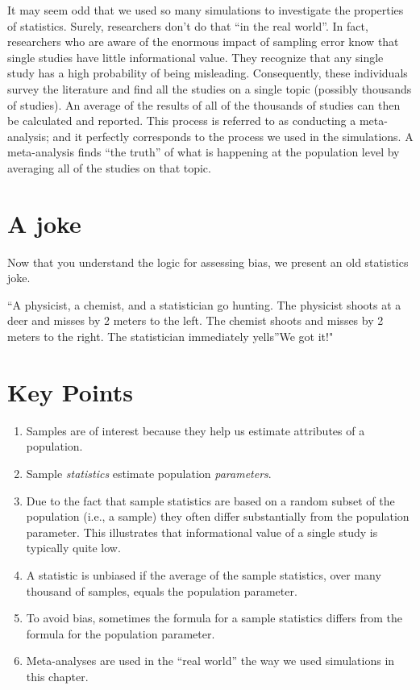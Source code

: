 \documentclass[
]{krantz}
\renewenvironment{quote}{\begin{VF}}{\end{VF}}
\begin{document}
It may seem odd that we used so many simulations to investigate the properties of statistics. Surely, researchers don't do that ``in the real world''. In fact, researchers who are aware of the enormous impact of sampling error know that single studies have little informational value. They recognize that any single study has a high probability of being misleading. Consequently, these individuals survey the literature and find all the studies on a single topic (possibly thousands of studies). An average of the results of all of the thousands of studies can then be calculated and reported. This process is referred to as conducting a meta-analysis; and it perfectly corresponds to the process we used in the simulations. A meta-analysis finds ``the truth'' of what is happening at the population level by averaging all of the studies on that topic.

\hypertarget{a-joke}{%
\section{A joke}\label{a-joke}}

Now that you understand the logic for assessing bias, we present an old statistics joke.

\begin{quote}
``A physicist, a chemist, and a statistician go hunting. The physicist shoots at a deer and misses by 2 meters to the left. The chemist shoots and misses by 2 meters to the right. The statistician immediately yells''We got it!"
\end{quote}

\hypertarget{key-points-1}{%
\section{Key Points}\label{key-points-1}}

\begin{enumerate}
\def\labelenumi{\arabic{enumi}.}
\item
  Samples are of interest because they help us estimate attributes of a population.
\item
  Sample \emph{statistics} estimate population \emph{parameters}.
\item
  Due to the fact that sample statistics are based on a random subset of the population (i.e., a sample) they often differ substantially from the population parameter. This illustrates that informational value of a single study is typically quite low.
\item
  A statistic is unbiased if the average of the sample statistics, over many thousand of samples, equals the population parameter.
\item
  To avoid bias, sometimes the formula for a sample statistics differs from the formula for the population parameter.
\item
  Meta-analyses are used in the ``real world'' the way we used simulations in this chapter.
\end{enumerate}
\end{document}
